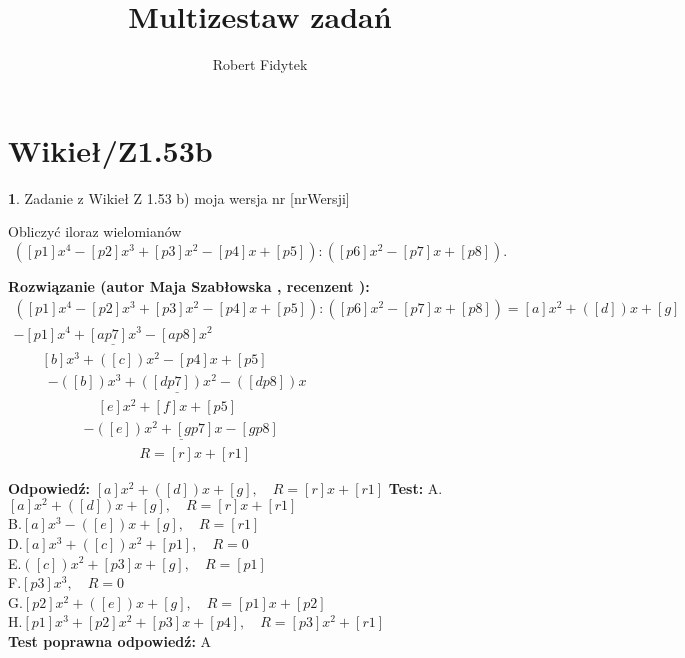 \documentclass[12pt, a4paper]{article}
\title{Multizestaw zadań}
\author{Robert Fidytek}
\date{}
\theoremstyle{definition} %
\newtheorem{zad}{}
\newcommand{\kategoria}[1]{\section{#1}} %
\newcommand{\zadStart}[1]{\begin{zad}#1\newline} %
\newcommand{\zadStop}{\end{zad}}   %
\newcommand{\rozwStart}[2]{\noindent \textbf{Rozwiązanie (autor #1 , recenzent #2): }\newline} %
\newcommand{\rozwStop}{\newline}                                            %
\newcommand{\odpStart}{\noindent \textbf{Odpowiedź:}\newline}    %
\newcommand{\odpStop}{\newline}                                             %
\newcommand{\testStart}{\noindent \textbf{Test:}\newline} %
\newcommand{\testStop}{\newline} %
\newcommand{\kluczStart}{\noindent \textbf{Test poprawna odpowiedź:}\newline} %
\newcommand{\kluczStop}{\newline} %
\begin{document}
\maketitle


\kategoria{Wikieł/Z1.53b}
\zadStart{Zadanie z Wikieł Z 1.53 b)  moja wersja nr [nrWersji]}

Obliczyć iloraz wielomianów $$([p1]x^{4}-[p2]x^{3}+[p3]x^{2}-[p4]x+[p5]):([p6]x^{2}-[p7]x+[p8]).$$

\zadStop

\rozwStart{Maja Szabłowska}{}
$$\begin{array}{lll}
([p1]x^{4}-[p2]x^{3}+[p3]x^{2}-[p4]x+[p5]):([p6]x^{2}-[p7]x+[p8])  =   [a]x^2  +([d])x +[g] \\
\underline{-[p1]x^4 +[ap7]x^3-[ap8]x^{2}} & &  \\
\qquad [b]x^3 + ([c])x^2 -[p4]x +[p5] & & \\
\qquad \ \ \underline{-([b])x^3 +([dp7])x^2 -([dp8])x} & &\\
\qquad \qquad \qquad [e]x^2 + [f]x + [p5] & & \\
\qquad \qquad \quad \underline{-([e])x^2 + [gp7]x - [gp8]}  & & \\
\qquad \qquad \qquad \qquad \quad R = [r]x+[r1] & &
\end{array}$$
\rozwStop


\odpStart
$[a]x^2  +([d])x +[g], \quad R = [r]x+[r1]$
\odpStop
\testStart
A.$[a]x^2  +([d])x +[g], \quad R = [r]x+[r1]$\\
B.$[a]x^3 - ([e])x +[g], \quad R = [r1]$\\
D.$[a]x^3 +([c])x^2 +[p1], \quad R = 0$\\
E.$([c])x^2 + [p3]x +[g], \quad R = [p1]$\\
F.$[p3]x^3 , \quad R = 0$\\
G.$[p2]x^2 + ([e])x +[g], \quad R = [p1]x+[p2]$\\
H.$[p1]x^3 +[p2]x^2 + [p3]x +[p4], \quad R = [p3]x^{2}+[r1]$\\
\testStop
\kluczStart
A
\kluczStop
\end{document}
